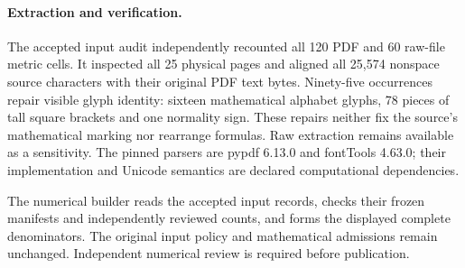\documentclass[11pt,a4paper]{article}
\begin{document}
\paragraph{Extraction and verification.}
The accepted input audit independently recounted all 120 PDF and 60 raw-file
metric cells. It inspected all 25 physical pages and aligned all 25,574
nonspace source characters with their original PDF text bytes. Ninety-five
occurrences repair visible glyph identity: sixteen mathematical alphabet
glyphs, 78 pieces of tall square brackets and one normality sign. These
repairs neither fix the source's mathematical marking nor rearrange formulas.
Raw extraction remains available as a sensitivity. The pinned parsers are
pypdf 6.13.0 and fontTools 4.63.0; their implementation and Unicode semantics
are declared computational dependencies.

The numerical builder reads the accepted input records, checks their frozen
manifests and independently reviewed counts, and forms the displayed complete
denominators. The original input policy and mathematical admissions remain
unchanged. Independent numerical review is required before publication.
\end{document}
